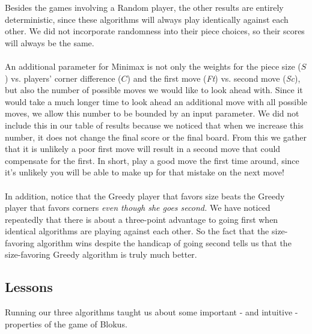 \documentclass[11pt]{article}
\begin{document}
\noindent Besides the games involving a Random player, the other results are entirely deterministic, since these algorithms will always play identically against each other. We did not incorporate randomness into their piece choices, so their scores will always be the same.
\\\\
An additional parameter for Minimax is not only the weights for the piece size ($S$) vs. players' corner difference ($C$) and the first move ({\it Ft}) vs. second move ({\it Sc}), but also the number of possible moves we would like to look ahead with. Since it would take a much longer time to look ahead an additional move with all possible moves, we allow this number to be bounded by an input parameter. We did not include this in our table of results because we noticed that when we increase this number, it does not change the final score or the final board. From this we gather that it is unlikely a poor first move will result in a second move that could compensate for the first. In short, play a good move the first time around, since it's unlikely you will be able to make up for that mistake on the next move!
\\\\
In addition, notice that the Greedy player that favors size beats the Greedy player that favors corners {\it even though she goes second.} We have noticed repeatedly that there is about a three-point advantage to going first when identical algorithms are playing against each other. So the fact that the size-favoring algorithm wins despite the handicap of going second tells us that the size-favoring Greedy algorithm is truly much better.

\subsection{Lessons}

Running our three algorithms taught us about some important - and intuitive - properties of the game of Blokus.
\end{document}

